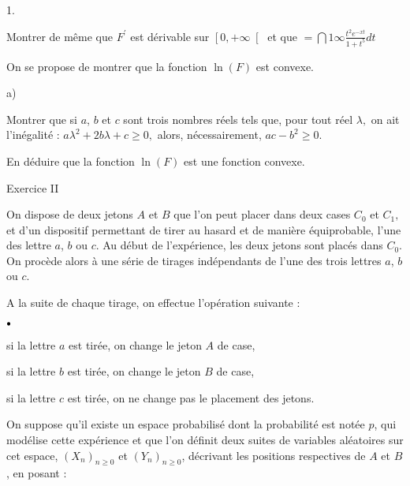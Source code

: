 \documentclass[11pt]{article}%
\begin{document}
\begin{noliste}{1.}
\item Montrer de même que $F^{\prime }$ est dérivable sur $\left[
0, + \infty \right[ $ et que $ = \dint{1}{\infty }\frac{t^{2}e^{-xt}}{1
+ t^{5}}dt$


\item On se propose de montrer que la fonction $\ln (F)$ est convexe.


\begin{noliste}{a)}
 \setlength{\itemsep}{2mm}
\item Montrer que si $a$, $b$ et $c$ sont trois nombres réels tels que,
pour tout réel $\lambda,$ on ait l'inégalité : $a\lambda
^{2} + 2b\lambda + c\geq 0,$ alors, nécessairement, $ac-b^{2}\geq 0.$


\item En déduire que la fonction $\ln (F)$ est une fonction convexe.



\end{noliste}
\end{noliste}


{\LARGE Exercice II}


On dispose de deux jetons $A$ et $B$ que l'on peut placer dans deux
cases $C_{0}$ et $C_{1},$ et d'un dispositif permettant de tirer au
hasard et de
manière équiprobable, l'une des lettre $a$, $b$ ou $c$. Au début
de l'expérience, les deux jetons sont placés dans $C_{0}.$ On
procède alors à une série de tirages indépendants de l'une
des trois lettres $a$, $b$ ou $c$.


A la suite de chaque tirage, on effectue l'opération suivante :


\begin{noliste}{$\scriptstyle \bullet$}
\item si la lettre $a$ est tirée, on change le jeton $A$ de case,


\item si la lettre $b$ est tirée, on change le jeton $B$ de case,


\item si la lettre $c$ est tirée, on ne change pas le placement des
jetons.
\end{noliste}


On suppose qu'il existe un espace probabilisé dont la probabilité est
notée $p$, qui modélise cette expérience et que l'on définit
deux suites de variables aléatoires sur cet espace, $\left(
X_{n}\right)
_{n\geq 0}$ et $\left( Y_{n}\right)_{n\geq 0}$, décrivant les positions
respectives de $A$ et $B$, en posant :
\end{document}
